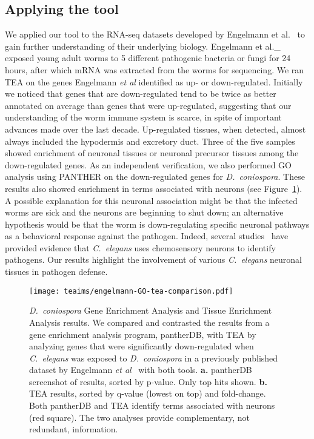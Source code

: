 \subsection*{Applying the tool}
We applied our tool to the RNA-seq datasets developed by Engelmann et
al.~\citep{Engelmann2011} to gain further understanding of their underlying
biology. Engelmann et al.\_ exposed young adult worms to 5 different pathogenic
bacteria or fungi for 24 hours, after which mRNA was extracted from the worms
for sequencing. We ran TEA on the genes Engelmann \emph{et al} identified as
up- or down-regulated. Initially we noticed that genes that are down-regulated
tend to be twice as better annotated on average than genes that were up-regulated,
suggesting that our understanding of the worm immune system is scarce, in spite
of important advances made over the last decade. Up-regulated tissues, when
detected, almost always included the hypodermis and excretory duct. Three of the
five samples showed enrichment of neuronal tissues or neuronal precursor tissues
among the down-regulated genes. As an independent verification, we also
performed GO analysis using PANTHER on the down-regulated genes for
\emph{D.~coniospora}. These results also showed enrichment in terms associated
with neurons (see Figure~\ref{fig:Dcon}). A possible explanation for this
neuronal association might be that the infected worms are sick and the neurons
are beginning to shut down; an alternative hypothesis would be that the worm is
down-regulating specific neuronal pathways as a behavioral response against the
pathogen. Indeed, several studies~\citep{Meisel2014, Zhang2005} have provided
evidence that \emph{C.~elegans} uses chemosensory neurons to identify pathogens.
Our results highlight the involvement of various \emph{C.~elegans} neuronal
tissues in pathogen defense.

\begin{figure}[htbp]
		\centering{}
    \texttt{[image: teaims/engelmann-GO-tea-comparison.pdf]}
  	\caption{
	\emph{D.~coniospora} Gene Enrichment Analysis and Tissue Enrichment
  Analysis results.
	We compared and contrasted the results from a gene enrichment analysis program,
  pantherDB, with TEA by analyzing genes that were significantly down-regulated
  when \emph{C.~elegans} was exposed to \emph{D.~coniospora} in a previously
  published dataset by Engelmann \emph{et al}~\citep{Engelmann2011} with both
  tools.
	\textbf{a.} pantherDB screenshot of results, sorted by p-value. Only top hits
  shown.
	\textbf{b.} TEA results, sorted by q-value (lowest on top) and fold-change.
	Both pantherDB and TEA identify terms associated with neurons (red square). The
  two analyses provide complementary, not redundant, information.
	}
\label{fig:Dcon}
\end{figure}


